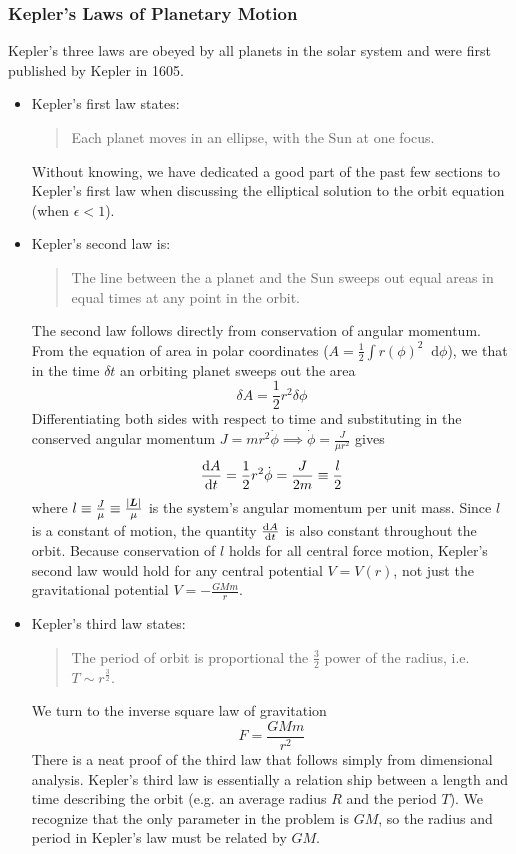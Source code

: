 \documentclass[11pt, a4paper]{article}
\newcommand{\diff}{\mathop{}\!\mathrm{d}} %
\begin{document}
\subsubsection{Kepler's Laws of Planetary Motion}
Kepler's three laws are obeyed by all planets in the solar system and were first published by Kepler in 1605.
\begin{itemize}
	\item Kepler's first law states:
	\begin{quote}
		Each planet moves in an ellipse, with the Sun at one focus.
	\end{quote}
	Without knowing, we have dedicated a good part of the past few sections to Kepler's first law when discussing the elliptical solution to the orbit equation (when $ \epsilon < 1 $). 
	
	\item Kepler's second law is:
	\begin{quote}
		The line between the a planet and the Sun sweeps out equal areas in equal times at any point in the orbit.
	\end{quote}
	The second law follows directly from conservation of angular momentum. From the equation of area in polar coordinates ($ A = \frac{1}{2}\int r(\phi)^{2}\diff \phi $), we that in the time $ \delta t $ an orbiting planet sweeps out the area
	\begin{equation*}
		\delta A = \frac{1}{2}r^{2} \delta \phi
	\end{equation*}
	Differentiating both sides with respect to time and substituting in the conserved angular momentum $ J = mr^{2}\dot{\phi} \implies \dot{\phi} = \frac{J}{\mu r^{2}}$ gives
	\begin{equation*}
		\dv{A}{t} = \frac{1}{2} r^{2} \dot{\phi} = \frac{J}{2m} \equiv \frac{l}{2}
	\end{equation*}
	where $ l \equiv \frac{J}{\mu} \equiv \frac{\abs{\bm{L}}}{\mu} $ is the system's angular momentum per unit mass. Since $ l $ is a constant of motion, the quantity $ \dv{A}{t} $ is also constant throughout the orbit. Because conservation of $ l $ holds for all central force motion, Kepler's second law would hold for any central potential $ V = V(r) $, not just the gravitational potential $ V = -\frac{GMm}{r} $.
	
	\item Kepler's third law states:
	\begin{quote}
		The period of orbit is proportional the $ \frac{3}{2} $ power of the radius, i.e. $ T \sim r^{\frac{3}{2}} $.
	\end{quote}
	We turn to the inverse square law of gravitation 
	\begin{equation*}
		F = \frac{GMm}{r^{2}}
	\end{equation*}
	There is a neat proof of the third law that follows simply from dimensional analysis. Kepler's third law is essentially a relation ship between a length and time describing the orbit (e.g. an average radius $ R $ and the period $ T $). We recognize that the only parameter in the problem is $ GM $, so the radius and period in Kepler's law must be related by $ GM $. 
	

\end{itemize}
\end{document}

